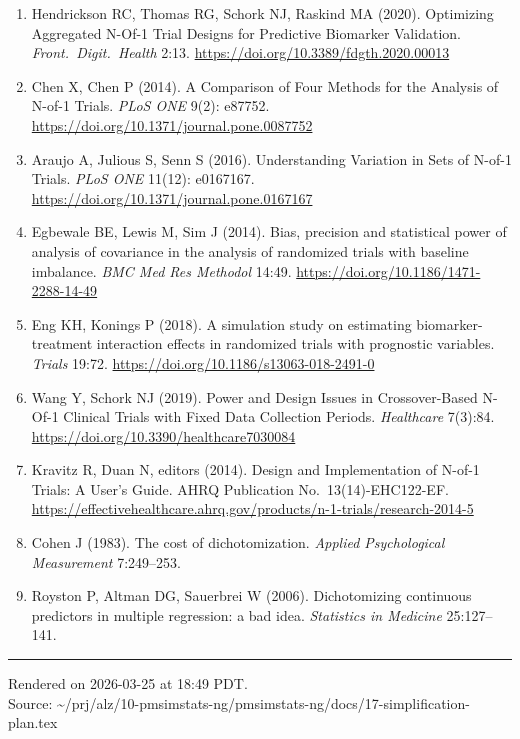 \documentclass[11pt]{article}
\begin{document}
\begin{enumerate}[nosep]
\item Hendrickson RC, Thomas RG, Schork NJ, Raskind MA (2020).
  Optimizing Aggregated N-Of-1 Trial Designs for Predictive Biomarker
  Validation. \textit{Front.\ Digit.\ Health} 2:13.
  \url{https://doi.org/10.3389/fdgth.2020.00013}

\item Chen X, Chen P (2014). A Comparison of Four Methods for the
  Analysis of N-of-1 Trials. \textit{PLoS ONE} 9(2): e87752.
  \url{https://doi.org/10.1371/journal.pone.0087752}

\item Araujo A, Julious S, Senn S (2016). Understanding Variation in
  Sets of N-of-1 Trials. \textit{PLoS ONE} 11(12): e0167167.
  \url{https://doi.org/10.1371/journal.pone.0167167}

\item Egbewale BE, Lewis M, Sim J (2014). Bias, precision and
  statistical power of analysis of covariance in the analysis of
  randomized trials with baseline imbalance. \textit{BMC Med Res
  Methodol} 14:49. \url{https://doi.org/10.1186/1471-2288-14-49}

\item Eng KH, Konings P (2018). A simulation study on estimating
  biomarker-treatment interaction effects in randomized trials with
  prognostic variables. \textit{Trials} 19:72.
  \url{https://doi.org/10.1186/s13063-018-2491-0}

\item Wang Y, Schork NJ (2019). Power and Design Issues in
  Crossover-Based N-Of-1 Clinical Trials with Fixed Data Collection
  Periods. \textit{Healthcare} 7(3):84.
  \url{https://doi.org/10.3390/healthcare7030084}

\item Kravitz R, Duan N, editors (2014). Design and Implementation of
  N-of-1 Trials: A User's Guide. AHRQ Publication No.\
  13(14)-EHC122-EF.
  \url{https://effectivehealthcare.ahrq.gov/products/n-1-trials/research-2014-5}

\item Cohen J (1983). The cost of dichotomization. \textit{Applied
  Psychological Measurement} 7:249--253.

\item Royston P, Altman DG, Sauerbrei W (2006). Dichotomizing
  continuous predictors in multiple regression: a bad idea.
  \textit{Statistics in Medicine} 25:127--141.
\end{enumerate}

\vfill
\noindent\rule{\textwidth}{0.4pt}
{\footnotesize
Rendered on 2026-03-25 at 18:49 PDT.\\
Source: \textasciitilde/prj/alz/10-pmsimstats-ng/pmsimstats-ng/docs/17-simplification-plan.tex}
\end{document}
